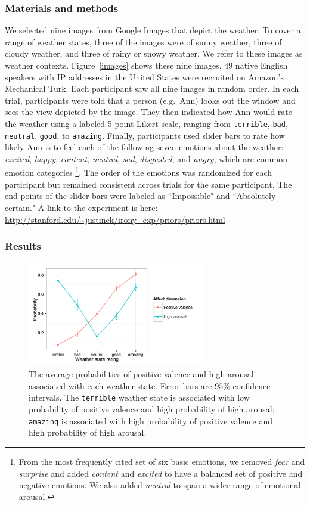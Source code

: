 \documentclass[10pt,letterpaper]{article}
\begin{document}
\subsubsection{Materials and methods}
We selected nine images from Google Images that depict the weather. To cover a range of weather states, three of the images were of sunny weather, three of cloudy weather, and three of rainy or snowy weather. We refer to these images as weather contexts. Figure~\ref{images} shows these nine images.
$49$ native English speakers with IP addresses in the United States were recruited on Amazon's Mechanical Turk. Each participant saw all nine images in random order. In each trial, participants were told that a person (e.g.~Ann) looks out the window and sees the view depicted by the image. They then indicated how Ann would rate the weather using a labeled 5-point Likert scale, ranging from \texttt{terrible}, \texttt{bad}, \texttt{neutral}, \texttt{good}, to \texttt{amazing}. Finally, participants used slider bars to rate how likely Ann is to feel each of the following seven emotions about the weather: \emph{excited}, \emph{happy}, \emph{content}, \emph{neutral}, \emph{sad}, \emph{disgusted}, and \emph{angry}, which are common emotion categories \cite{ekman1992argument}\footnote{From the most frequently cited set of six basic emotions, we removed \emph{fear} and \emph{surprise} and added \emph{content} and \emph{excited} to have a balanced set of positive and negative emotions. We also added \emph{neutral} to span a wider range of emotional arousal.}.
The order of the emotions was randomized for each participant but remained consistent across trials for the same participant. The end points of the slider bars were labeled as ``Impossible" and ``Absolutely certain." A link to the experiment is here: \url{http://stanford.edu/~justinek/irony_exp/priors/priors.html}
  
 
\subsubsection{Results}
\begin{figure}
\includegraphics[width=220pt, height=130pt]{affect-prior.pdf}
\caption{The average probabilities of positive valence and high arousal associated with each weather state. Error bars are $95\%$ confidence intervals. The \texttt{terrible} weather state is associated with low probability of positive valence and high probability of high arousal; \texttt{amazing} is associated with high probability of positive valence and high probability of high arousal.}
\label{affect-prior}
\end{figure}
\end{document}
